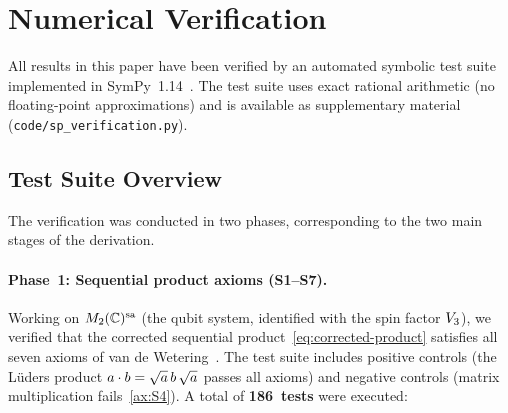 
\section{Numerical Verification}\label{app:numerics}

All results in this paper have been verified by an automated symbolic
test suite implemented in SymPy~1.14~\cite{SymPy2017}.  The test suite
uses exact rational arithmetic (no floating-point approximations) and
is available as supplementary material
(\texttt{code/sp\_verification.py}).

\subsection{Test Suite Overview}

The verification was conducted in two phases, corresponding to the
two main stages of the derivation.

\paragraph{Phase~1: Sequential product axioms (S1--S7).}
Working on $\Mnsa{2}$ (the qubit system, identified with the spin
factor $\spinfactor{3}$), we verified that the corrected sequential
product~\eqref{eq:corrected-product} satisfies all seven axioms of
van de Wetering~\cite{vandeWetering2019b}.  The test suite includes
positive controls (the L\"uders product $\sp{a}{b} = \sqrt{a}\,b\,
\sqrt{a}$ passes all axioms) and negative controls (matrix
multiplication fails~\ref{ax:S4}).
A total of \textbf{186~tests} were executed:

